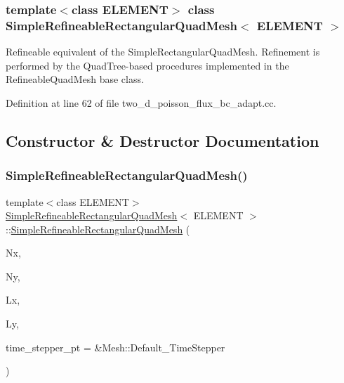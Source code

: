 \subsubsection*{template$<$class E\+L\+E\+M\+E\+NT$>$\newline
class Simple\+Refineable\+Rectangular\+Quad\+Mesh$<$ E\+L\+E\+M\+E\+N\+T $>$}

Refineable equivalent of the Simple\+Rectangular\+Quad\+Mesh. Refinement is performed by the Quad\+Tree-\/based procedures implemented in the Refineable\+Quad\+Mesh base class. 

Definition at line 62 of file two\+\_\+d\+\_\+poisson\+\_\+flux\+\_\+bc\+\_\+adapt.\+cc.



\subsection{Constructor \& Destructor Documentation}
\mbox{\label{classSimpleRefineableRectangularQuadMesh_ae0eab85a2c97fce00d7c82a613378e79}} 
\subsubsection{\texorpdfstring{Simple\+Refineable\+Rectangular\+Quad\+Mesh()}{SimpleRefineableRectangularQuadMesh()}}
{\footnotesize\ttfamily template$<$class E\+L\+E\+M\+E\+NT$>$ \\
\hyperlink{classSimpleRefineableRectangularQuadMesh}{Simple\+Refineable\+Rectangular\+Quad\+Mesh}$<$ E\+L\+E\+M\+E\+NT $>$\+::\hyperlink{classSimpleRefineableRectangularQuadMesh}{Simple\+Refineable\+Rectangular\+Quad\+Mesh} (\begin{DoxyParamCaption}\item[{const unsigned \&}]{Nx,  }\item[{const unsigned \&}]{Ny,  }\item[{const double \&}]{Lx,  }\item[{const double \&}]{Ly,  }\item[{Time\+Stepper $\ast$}]{time\+\_\+stepper\+\_\+pt = {\ttfamily \&Mesh\+:\+:Default\+\_\+TimeStepper} }\end{DoxyParamCaption})\hspace{0.3cm}{\ttfamily [inline]}}



